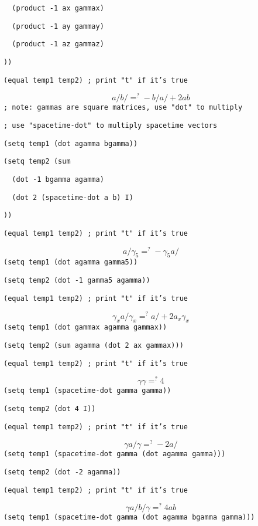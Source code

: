 {\tt \ \ (product\ -1\ ax\ gammax)}

{\tt \ \ (product\ -1\ ay\ gammay)}

{\tt \ \ (product\ -1\ az\ gammaz)}

{\tt ))}

{\tt (equal\ temp1\ temp2)\ ;\ print\ "t"\ if\ it's\ true}

$$a\!\!\!/b\!\!\!/\mathrel{\mathop=^?}-b\!\!\!/a\!\!\!/ + 2ab$$
{\tt ;\ note:\ gammas\ are\ square\ matrices,\ use\ "dot"\ to\ multiply}

{\tt ;\ use\ "spacetime-dot"\ to\ multiply\ spacetime\ vectors}

{\tt (setq\ temp1\ (dot\ agamma\ bgamma))}

{\tt (setq\ temp2\ (sum}

{\tt \ \ (dot\ -1\ bgamma\ agamma)}

{\tt \ \ (dot\ 2\ (spacetime-dot\ a\ b)\ I)}

{\tt ))}

{\tt (equal\ temp1\ temp2)\ ;\ print\ "t"\ if\ it's\ true}

$$a\!\!\!/\gamma_5\mathrel{\mathop=^?}-\gamma_5a\!\!\!/$$
{\tt (setq\ temp1\ (dot\ agamma\ gamma5))}

{\tt (setq\ temp2\ (dot\ -1\ gamma5\ agamma))}

{\tt (equal\ temp1\ temp2)\ ;\ print\ "t"\ if\ it's\ true}

$$\gamma_x a\!\!\!/\gamma_x\mathrel{\mathop=^?}a\!\!\!/+2a_x\gamma_x$$
{\tt (setq\ temp1\ (dot\ gammax\ agamma\ gammax))}

{\tt (setq\ temp2\ (sum\ agamma\ (dot\ 2\ ax\ gammax)))}

{\tt (equal\ temp1\ temp2)\ ;\ print\ "t"\ if\ it's\ true}

$$\gamma\gamma\mathrel{\mathop=^?}4$$
{\tt (setq\ temp1\ (spacetime-dot\ gamma\ gamma))}

{\tt (setq\ temp2\ (dot\ 4\ I))}

{\tt (equal\ temp1\ temp2)\ ;\ print\ "t"\ if\ it's\ true}

$$\gamma a\!\!\!/\gamma\mathrel{\mathop=^?}-2a\!\!\!/$$
{\tt (setq\ temp1\ (spacetime-dot\ gamma\ (dot\ agamma\ gamma)))}

{\tt (setq\ temp2\ (dot\ -2\ agamma))}

{\tt (equal\ temp1\ temp2)\ ;\ print\ "t"\ if\ it's\ true}

$$\gamma a\!\!\!/b\!\!\!/\gamma\mathrel{\mathop=^?}4ab$$
{\tt (setq\ temp1\ (spacetime-dot\ gamma\ (dot\ agamma\ bgamma\ gamma)))}

